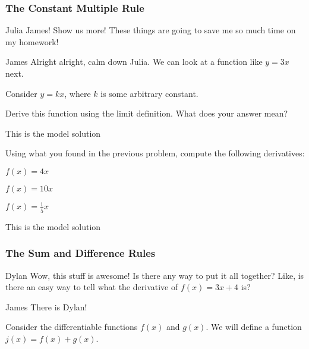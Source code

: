 \documentclass{ximera}
\begin{document}
\subsubsection{The Constant Multiple Rule}
\begin{dialogue}
\item[Julia] James! Show us more! These things are going to save me so much time on my homework!
\item[James] Alright alright, calm down Julia. We can look at a function like $y = 3x$ next.
\end{dialogue}

Consider $y = kx$, where $k$ is some arbitrary constant.
\begin{question}
\item{Derive this function using the limit definition. What does your answer mean?}
\begin{freeResponse}
This is the model solution %
\end{freeResponse}
\end{question}

\begin{question}
\item{Using what you found in the previous problem, compute the following derivatives:}
\item{$f(x)=4x$}
\item{$f(x)=10x$}
\item{$f(x)=\frac{1}{5}x$}
\begin{freeResponse}
This is the model solution %
\end{freeResponse}
\end{question}

\subsubsection{The Sum and Difference Rules}
\begin{dialogue}
\item[Dylan] Wow, this stuff is awesome! Is there any way to put it all together? Like, is there an easy way to tell what the derivative of $f(x) = 3x+4$ is?
\item[James] There is Dylan! 
\end{dialogue}
Consider the differentiable functions $f(x)$ and $g(x)$. We will define a function $j(x) = f(x) + g(x)$.
\end{document}
